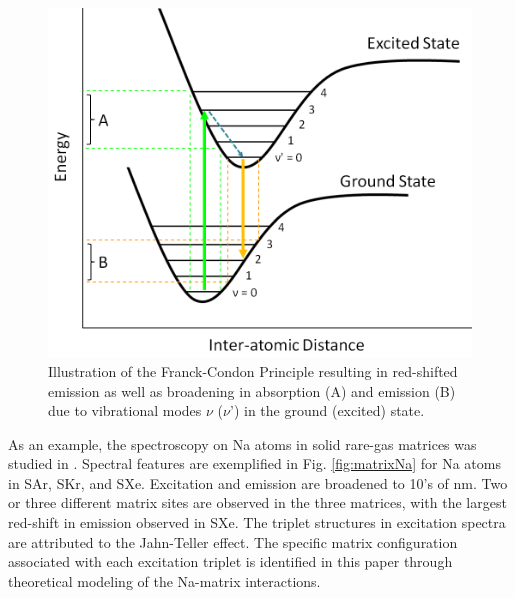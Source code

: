 



\begin{figure} %
        \centering
                \includegraphics[width=.7\textwidth]{figures/FranckCondon.png}
                \caption{Illustration of the Franck-Condon Principle resulting in red-shifted emission as well as broadening in absorption (A) and emission (B) due to vibrational modes $\nu$ ($\nu$') in the ground (excited) state.}
\label{fig:FranckCondon}
\end{figure}

As an example, the spectroscopy on Na atoms in solid rare-gas matrices was studied in \cite{matrixNa}.  Spectral features are exemplified in Fig. \ref{fig:matrixNa} for Na atoms in SAr, SKr, and SXe.  Excitation and emission are broadened to 10's of nm.  Two or three different matrix sites are observed in the three matrices, with the largest red-shift in emission observed in SXe.  The triplet structures in excitation spectra are attributed to the Jahn-Teller effect.  The specific matrix configuration associated with each excitation triplet is identified in this paper through theoretical modeling of the Na-matrix interactions.

